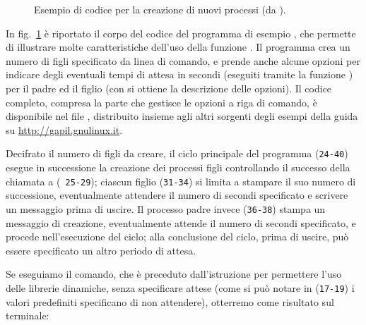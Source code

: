 \begin{figure}[!htb]
  \footnotesize \centering
  \begin{minipage}[c]{\codesamplewidth}
  \end{minipage}
  \normalsize
  \caption{Esempio di codice per la creazione di nuovi processi (da
    ).}
  \label{fig:proc_fork_code}
\end{figure}

In fig.~\ref{fig:proc_fork_code} è riportato il corpo del codice del programma
di esempio , che permette di illustrare molte caratteristiche
dell'uso della funzione . Il programma crea un numero di figli
specificato da linea di comando, e prende anche alcune opzioni per indicare
degli eventuali tempi di attesa in secondi (eseguiti tramite la funzione
) per il padre ed il figlio (con  si ottiene la
descrizione delle opzioni). Il codice completo, compresa la parte che gestisce
le opzioni a riga di comando, è disponibile nel file ,
distribuito insieme agli altri sorgenti degli esempi della guida su
\url{http://gapil.gnulinux.it}.

Decifrato il numero di figli da creare, il ciclo principale del programma
(\texttt{\small 24-40}) esegue in successione la creazione dei processi figli
controllando il successo della chiamata a  (\texttt{\small
  25-29}); ciascun figlio (\texttt{\small 31-34}) si limita a stampare il
suo numero di successione, eventualmente attendere il numero di secondi
specificato e scrivere un messaggio prima di uscire. Il processo padre invece
(\texttt{\small 36-38}) stampa un messaggio di creazione, eventualmente
attende il numero di secondi specificato, e procede nell'esecuzione del ciclo;
alla conclusione del ciclo, prima di uscire, può essere specificato un altro
periodo di attesa.

Se eseguiamo il comando, che è preceduto dall'istruzione  per permettere l'uso delle librerie dinamiche, senza
specificare attese (come si può notare in (\texttt{\small 17-19}) i valori
predefiniti specificano di non attendere), otterremo come risultato sul
terminale:

